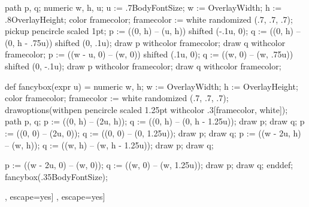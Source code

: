 path p, q;
numeric w, h, u;
u := .7BodyFontSize;
w := OverlayWidth; h := .8OverlayHeight;
color framecolor; framecolor := white randomized (.7, .7, .7);
pickup pencircle scaled 1pt;
p := ((0, h) -- (u, h)) shifted (-.1u, 0);
q := ((0, h) -- (0, h - .75u)) shifted (0, .1u);
draw p withcolor framecolor;
draw q withcolor framecolor;
p := ((w - u, 0) -- (w, 0)) shifted (.1u, 0);
q := ((w, 0) -- (w, .75u)) shifted (0, -.1u);
draw p withcolor framecolor;
draw q withcolor framecolor;
\stopuniqueMPgraphic
{}
\def\boxquote#1{%
  \kern.25em%
  \inframed[frame=off,
            background=boxquotebg,
            offset=0pt,
            loffset=.25em,
            roffset=.25em]{#1}%
  \kern.25em%
}

\startMPinclusions
def fancybox(expr u) =
  numeric w, h;
  w := OverlayWidth; h := OverlayHeight;
  color framecolor; framecolor := white randomized (.7, .7, .7);
  drawoptions(withpen pencircle scaled 1.25pt withcolor .3[framecolor, white]);
  path p, q;
  p := ((0, h) -- (2u, h));
  q := ((0, h) -- (0, h - 1.25u));
  draw p; draw q;
  p := ((0, 0) -- (2u, 0));
  q := ((0, 0) -- (0, 1.25u));
  draw p; draw q;
  p := ((w - 2u, h) -- (w, h));
  q := ((w, h) -- (w, h - 1.25u));
  draw p; draw q;
  
  p := ((w - 2u, 0) -- (w, 0));
  q := ((w, 0) -- (w, 1.25u));
  draw p; draw q;
enddef;
\stopMPinclusions
{}
fancybox(.35BodyFontSize);
\stopuseMPgraphic
{}

\setuptype[color=darkred]
\setuptyping[mycmd]
  [before={\setupinterlinespace[line=3ex]\startstrangebox[width=\textwidth]},
   after={\stopstrangebox\setupinterlinespace[line=3.75ex]},
   style=\switchtobodyfont[tt,10pt],
   escape=yes]
\setuptyping
  [before={\startstrangebox[width=\textwidth]},
   after={\stopstrangebox},
   style=\switchtobodyfont[tt,10pt],
   escape=yes]

\setupfloat [Example][indentnext=yes]
\setuplabeltext[cn][Example={例 }]

